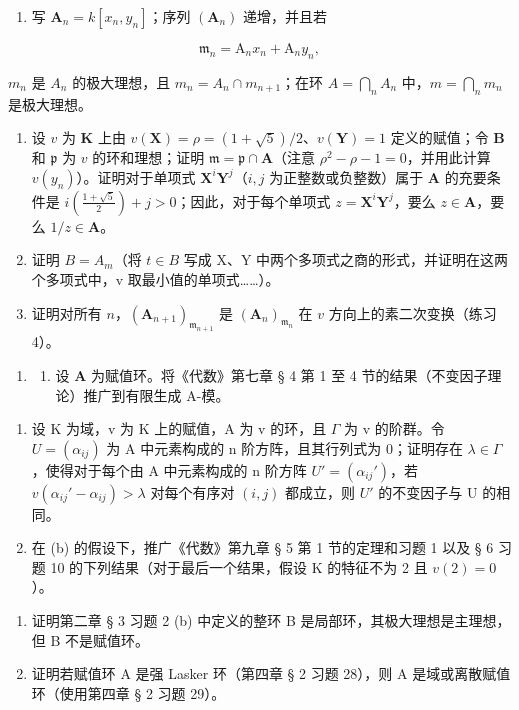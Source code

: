 \begin{enumerate}
\def\labelenumi{(\alph{enumi})}
\tightlist
\item
  写 \(\mathbf{A}_n = k[x_n, y_n]\)；序列 \((\mathbf{A}_n)\) 递增，并且若
\end{enumerate}

\[
\mathfrak {m} _ {n} = \mathrm{A} _ {n} x _ {n} + \mathrm{A} _ {n} y _ {n},
\]

\(m_{n}\) 是 \(A_{n}\) 的极大理想，且 \(m_{n} = A_{n} \cap m_{n+1}\)；在环 \(A = \bigcap_{n} A_{n}\) 中，\(m = \bigcap_{n} m_{n}\) 是极大理想。

\begin{enumerate}
\def\labelenumi{(\alph{enumi})}
\setcounter{enumi}{1}
\item
  设 \(v\) 为 \(\mathbf{K}\) 上由 \(v(\mathbf{X}) = \rho = (1 + \sqrt{5}) / 2\)、\(v(\mathbf{Y}) = 1\) 定义的赋值；令 \(\mathbf{B}\) 和 \(\mathfrak{p}\) 为 \(v\) 的环和理想；证明 \(\mathfrak{m} = \mathfrak{p} \cap \mathbf{A}\)（注意 \(\rho^2 - \rho - 1 = 0\)，并用此计算 \(v(y_n)\)）。证明对于单项式 \(\mathbf{X}^i\mathbf{Y}^j\)（\(i, j\) 为正整数或负整数）属于 \(\mathbf{A}\) 的充要条件是 \(i\left(\frac{1 + \sqrt{5}}{2}\right) + j > 0\)；因此，对于每个单项式 \(z = \mathbf{X}^i\mathbf{Y}^j\)，要么 \(z \in \mathbf{A}\)，要么 \(1/z \in \mathbf{A}\)。
\item
  证明 \(B = A_{m}\)（将 \(t \in B\) 写成 X、Y 中两个多项式之商的形式，并证明在这两个多项式中，v 取最小值的单项式……）。
\item
  证明对所有 \(n\)，\((\mathbf{A}_{n+1})_{\mathfrak{m}_{n+1}}\) 是 \((\mathbf{A}_n)_{\mathfrak{m}_n}\) 在 \(v\) 方向上的素二次变换（练习 4）。
\end{enumerate}

\begin{enumerate}
\def\labelenumi{\arabic{enumi}.}
\setcounter{enumi}{5}
\tightlist
\item
  \begin{enumerate}
  \def\labelenumii{(\alph{enumii})}
  \tightlist
  \item
    设 \(\mathbf{A}\) 为赋值环。将《代数》第七章 § 4 第 1 至 4 节的结果（不变因子理论）推广到有限生成 A-模。
  \end{enumerate}
\end{enumerate}

\begin{enumerate}
\def\labelenumi{(\alph{enumi})}
\setcounter{enumi}{1}
\item
  设 K 为域，v 为 K 上的赋值，A 为 v 的环，且 \(\Gamma\) 为 v 的阶群。令 \(U = (\alpha_{ij})\) 为 A 中元素构成的 n 阶方阵，且其行列式为 0；证明存在 \(\lambda \in \Gamma\)，使得对于每个由 A 中元素构成的 n 阶方阵 \(U' = (\alpha_{ij}')\)，若 \(v(\alpha_{ij}' - \alpha_{ij}) > \lambda\) 对每个有序对 \((i,j)\) 都成立，则 \(U'\) 的不变因子与 U 的相同。
\item
  在 (b) 的假设下，推广《代数》第九章 § 5 第 1 节的定理和习题 1 以及 § 6 习题 10 的下列结果（对于最后一个结果，假设 K 的特征不为 2 且 \(v(2) = 0\)）。
\end{enumerate}

\begin{enumerate}
\def\labelenumi{\arabic{enumi}.}
\setcounter{enumi}{6}
\item
  证明第二章 § 3 习题 2 (b) 中定义的整环 B 是局部环，其极大理想是主理想，但 B 不是赋值环。
\item
  证明若赋值环 A 是强 Lasker 环（第四章 § 2 习题 28），则 A 是域或离散赋值环（使用第四章 § 2 习题 29）。
\end{enumerate}
\relax{}
